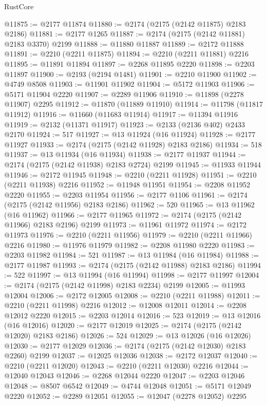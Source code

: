 \begin{lexlean}{RustCore}
\begin{coremodule}
@11875 := @2177 @11874
@11880 := @2174 (@2175 (@2142 @11875) @2183 @2186)
@11881 := @2177 @1265
@11887 := @2174 (@2175 (@2142 @11881) @2183 @3370) @2199
@11888 := @11880 @11887
@11889 := @2172 @11888
@11891 := @2210 (@2211 @11875)
@11894 := @2210 (@2211 @11881) @2216
@11895 := @11891 @11894
@11897 := @2268 @11895 @2220
@11898 := @2203 @11897
@11900 := @2193 (@2194 @1481)
@11901 := @2210 @11900
@11902 := @4749 @8508
@11903 := @11901 @11902
@11904 := @5172 @11903
@11906 := @5171 @11904 @2220
@11907 := @2289 @11906
@11910 := @11898 (@2278 @11907) @2295
@11912 := @11870 (@11889 @11910)
@11914 := @11798 (@11817 @11912)
@11916 := @11660 (@11683 @11914)
@11917 := @11394 @11916
@11919 := @2132 (@11371 @11917)
@11923 := @2133 (@2136 @402) @2433 @2170
@11924 := 517
@11927 := @13 @11924 (@16 @11924)
@11928 := @2177 @11927
@11933 := @2174 (@2175 (@2142 @11928) @2183 @2186)
@11934 := 518
@11937 := @13 @11934 (@16 @11934)
@11938 := @2177 @11937
@11944 := @2174 (@2175 (@2142 @11938) @2183 @2724) @2199
@11945 := @11933 @11944
@11946 := @2172 @11945
@11948 := @2210 (@2211 @11928)
@11951 := @2210 (@2211 @11938) @2216
@11952 := @11948 @11951
@11954 := @2208 @11952 @2220
@11955 := @2203 @11954
@11956 := @2177 @1106
@11961 := @2174 (@2175 (@2142 @11956) @2183 @2186)
@11962 := 520
@11965 := @13 @11962 (@16 @11962)
@11966 := @2177 @11965
@11972 := @2174 (@2175 (@2142 @11966) @2183 @2196) @2199
@11973 := @11961 @11972
@11974 := @2172 @11973
@11976 := @2210 (@2211 @11956)
@11979 := @2210 (@2211 @11966) @2216
@11980 := @11976 @11979
@11982 := @2208 @11980 @2220
@11983 := @2203 @11982
@11984 := 521
@11987 := @13 @11984 (@16 @11984)
@11988 := @2177 @11987
@11993 := @2174 (@2175 (@2142 @11988) @2183 @2186)
@11994 := 522
@11997 := @13 @11994 (@16 @11994)
@11998 := @2177 @11997
@12004 := @2174 (@2175 (@2142 @11998) @2183 @2234) @2199
@12005 := @11993 @12004
@12006 := @2172 @12005
@12008 := @2210 (@2211 @11988)
@12011 := @2210 (@2211 @11998) @2216
@12012 := @12008 @12011
@12014 := @2208 @12012 @2220
@12015 := @2203 @12014
@12016 := 523
@12019 := @13 @12016 (@16 @12016)
@12020 := @2177 @12019
@12025 := @2174 (@2175 (@2142 @12020) @2183 @2186)
@12026 := 524
@12029 := @13 @12026 (@16 @12026)
@12030 := @2177 @12029
@12036 := @2174 (@2175 (@2142 @12030) @2183 @2260) @2199
@12037 := @12025 @12036
@12038 := @2172 @12037
@12040 := @2210 (@2211 @12020)
@12043 := @2210 (@2211 @12030) @2216
@12044 := @12040 @12043
@12046 := @2268 @12044 @2220
@12047 := @2203 @12046
@12048 := @8507 @6542
@12049 := @4744 @12048
@12051 := @5171 @12049 @2220
@12052 := @2289 @12051
@12055 := @12047 (@2278 @12052) @2295

\end{coremodule}
\end{lexlean}
